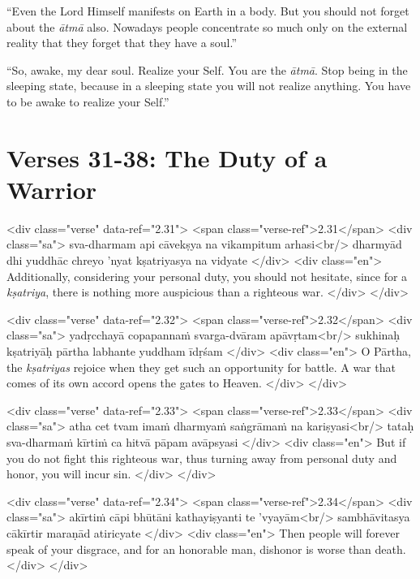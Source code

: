 \enquote{Even the Lord Himself manifests on Earth in a body. But you should not forget about the \textit{ātmā} also. Nowadays people concentrate so much only on the external reality that they forget that they have a soul.}


\enquote{So, awake, my dear soul. Realize your Self. You are the \textit{ātmā}. Stop being in the sleeping state, because in a sleeping state you will not realize anything. You have to be awake to realize your Self.}


\section{Verses 31-38: The Duty of a Warrior}\label{sec-verses-31-38-the-duty-of-a-warrior}


\begin{html}
<div class="verse" data-ref="2.31">
  <span class="verse-ref">2.31</span>
  <div class="sa">
    sva-dharmam api cāvekṣya na vikampitum arhasi<br/>
    dharmyād dhi yuddhāc chreyo ’nyat kṣatriyasya na vidyate
  </div>
  <div class="en">
    Additionally, considering your personal duty, you should not hesitate, since for a \textit{kṣatriya}, there is nothing more auspicious than a righteous war.
  </div>
</div>
\end{html}



\begin{html}
<div class="verse" data-ref="2.32">
  <span class="verse-ref">2.32</span>
  <div class="sa">
    yadṛcchayā copapannaṁ svarga-dvāram apāvṛtam<br/>
    sukhinaḥ kṣatriyāḥ pārtha labhante yuddham īdṛśam
  </div>
  <div class="en">
    O Pārtha, the \textit{kṣatriyas} rejoice when they get such an opportunity for battle. A war that comes of its own accord opens the gates to Heaven.
  </div>
</div>
\end{html}



\begin{html}
<div class="verse" data-ref="2.33">
  <span class="verse-ref">2.33</span>
  <div class="sa">
    atha cet tvam imaṁ dharmyaṁ saṅgrāmaṁ na kariṣyasi<br/>
    tataḥ sva-dharmaṁ kīrtiṁ ca hitvā pāpam avāpsyasi
  </div>
  <div class="en">
    But if you do not fight this righteous war, thus turning away from personal duty and honor, you will incur sin.
  </div>
</div>
\end{html}



\begin{html}
<div class="verse" data-ref="2.34">
  <span class="verse-ref">2.34</span>
  <div class="sa">
    akīrtiṁ cāpi bhūtāni kathayiṣyanti te ’vyayām<br/>
    sambhāvitasya cākīrtir maraṇād atiricyate
  </div>
  <div class="en">
    Then people will forever speak of your disgrace, and for an honorable man, dishonor is worse than death.
  </div>
</div>
\end{html}



